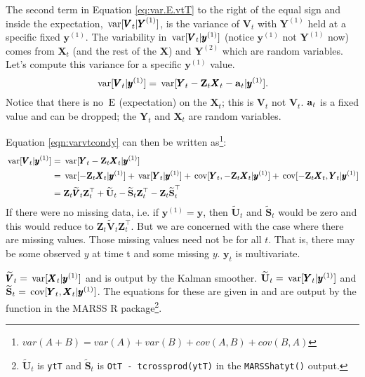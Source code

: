 \documentclass[]{article}
\def\XI{\mbox{\boldmath $\Xi$}}
\def\E{\,\textup{\textrm{E}}}
\def\Ss{\mbox{$\mathbf S$}}
\def\UU{\mbox{$\mathbf U$}}	\def\uu{\mbox{$\mathbf u$}}
\def\VV{\mbox{$\pmb{V}$}}	\def\vv{\mbox{$\pmb{v}$}}
\def\XX{\mbox{$\pmb{X}$}}	\def\xx{\mbox{$\pmb{x}$}}
\def\YY{\mbox{$\pmb{Y}$}}	\def\yy{\mbox{$\pmb{y}$}}
\def\ZZ{\mbox{$\mathbf Z$}}	\def\zz{\mbox{$\mathbf z$}}	\def\Zb{\mbox{$\mathbf M$}} \def\Za{\mbox{$\mathbf N$}} \def\Zm{\XI}
\def\var{\,\textup{\textrm{var}}}
\def\cov{\,\textup{\textrm{cov}}}
\def\hatVt{\widetilde{\VV}_t}
\def\hatUt{\widetilde{\UU}_t}
\def\hatSt{\widetilde{\Ss}_t}
\begin{document}
The second term in Equation \ref{eq:var.E.vtT} to the right of the equal sign and inside the expectation, $\var[\VV_t|\YY^{(1)}]$, is the variance of $\VV_t$ with $\YY^{(1)}$ held at a specific fixed $\yy^{(1)}$. The variability in $\var[\VV_t|\yy^{(1)}]$ (notice $\yy^{(1)}$ not $\YY^{(1)}$ now) comes from $\XX_t$ (and the rest of the $\XX$) and $\YY^{(2)}$ which are random variables. Let's compute this variance for a specific $\yy^{(1)}$ value.
\begin{equation}\label{eqn:varvtcondy}
\var[\VV_t|\yy^{(1)}] = \var[ \YY_t - \ZZ_t\XX_t-\aa_t | \yy^{(1)} ].
\end{equation}
Notice that there is no $\E$ (expectation) on the $\XX_t$; this is $\VV_t$ not $\hat{\VV}_t$. $\aa_t$ is a fixed value and can be dropped; the $\YY_t$ and $\XX_t$ are random variables.

Equation \ref{eqn:varvtcondy} can then be written as\footnote{$var(A+B)=var(A)+var(B)+cov(A,B)+cov(B,A)$}:
\begin{equation}
\begin{split}
\var[\VV_t|\yy^{(1)}] &= \var[ \YY_t - \ZZ_t\XX_t | \yy^{(1)} ]\\
&=\var[ - \ZZ_t\XX_t | \yy^{(1)} ] + \var[ \YY_t|\yy^{(1)}] + \cov[ \YY_t, - \ZZ_t\XX_t | \yy^{(1)} ] + \cov[ - \ZZ_t\XX_t, \YY_t | \yy^{(1)} ]\\
&=\ZZ_t \hatVt \ZZ_t^\top + \hatUt - \hatSt\ZZ_t^\top - \ZZ_t\hatSt^\top
\end{split}
\end{equation}
If there were no missing data, i.e. if $\yy^{(1)}=\yy$, then $\hatUt$ and $\hatSt$ would be zero and this would reduce to $\ZZ_t \hatVt \ZZ_t^\top$. But we are concerned with the case where there are missing values. Those missing values need not be for all $t$. That is, there may be some observed $y$ at time t and some missing $y$. $\yy_t$ is multivariate.

$\hatVt = \var[ \XX_t | \yy^{(1)} ]$ and is output by the Kalman smoother. $\hatUt=\var[\YY_t|\yy^{(1)}]$ and $\hatSt=\cov[\YY_t,\XX_t|\yy^{(1)}]$. The equations for these are given in \citet{Holmes2010} and are output by the \verb@MARSShatyt@ function in the MARSS R package\footnote{$\hatUt$ is \texttt{ytT} and $\hatSt$ is \texttt{OtT - tcrossprod(ytT)} in the \texttt{MARSShatyt()} output.}.
\end{document}
